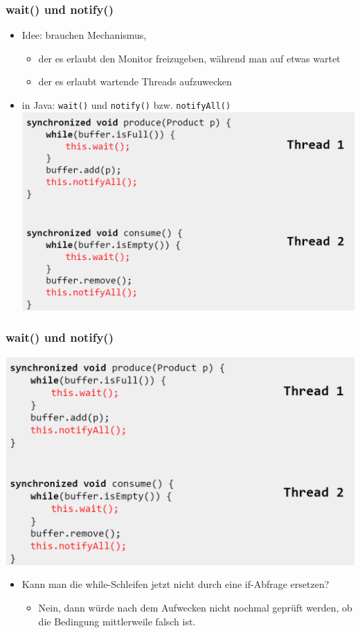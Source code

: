 \documentclass[18pt]{beamer}
\begin{document}
	\begin{frame}
		\frametitle{wait() und notify()}
		\begin{itemize}
			\item Idee: brauchen Mechanismus,
			\begin{itemize}
				\item der es erlaubt den Monitor freizugeben, während man auf etwas wartet \pause
				\item der es erlaubt wartende Threads aufzuwecken \pause
			\end{itemize}
			\item in Java: \texttt{wait()} und \texttt{notify()} bzw. \texttt{notifyAll()} \pause
			\includegraphics[scale=0.3]{./pics/tut5/cons-prod-sol.png}
		\end{itemize}
	\end{frame}

	\begin{frame}
		\frametitle{wait() und notify()}
		\includegraphics[scale=0.3]{./pics/tut5/cons-prod-sol.png}
		\begin{itemize}
			\item Kann man die while-Schleifen jetzt nicht durch eine if-Abfrage ersetzen? \pause
			\begin{itemize}
				\item Nein, dann würde nach dem Aufwecken nicht nochmal geprüft werden, ob die Bedingung mittlerweile falsch ist.
			\end{itemize}
		\end{itemize}
	\end{frame}
\end{document}
